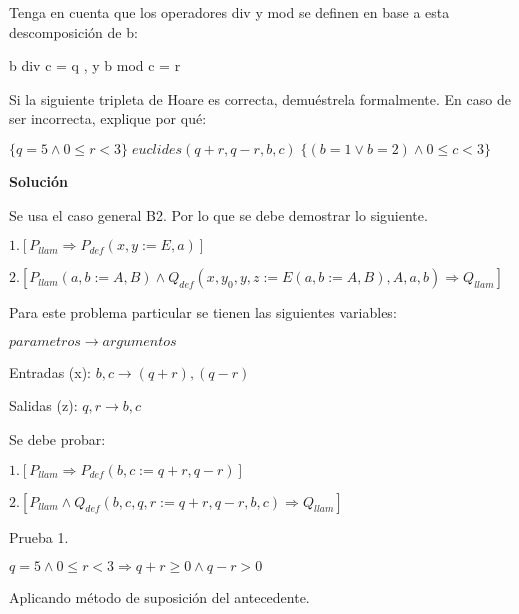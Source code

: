 \documentclass[hidelinks]{article}
\begin{document}
Tenga en cuenta que los operadores div y mod se definen en base a esta
descomposición de b: \par

\begin{center}
	b div c = q , y b mod c = r
\end{center}

Si la siguiente tripleta de Hoare es correcta, demuéstrela formalmente. En caso
de ser incorrecta, explique por qué:\par

$\{ q = 5 \land 0 \leq r < 3 \} \; euclides(q + r, q - r, b, c) \; \{ (b = 1 \lor b = 2) \land 0 \leq c < 3 \}$ \par

\textbf{Solución}

Se usa el caso general B2. Por lo que se debe demostrar lo siguiente. \par

$1. [P_{llam} \Rightarrow P_{def}(x,y := E, a)]$ \par

$2. [P_{llam}(a,b := A, B) \land Q_{def}(x,y_0,y,z := E(a,b := A,B), A, a,b) \Rightarrow Q_{llam}]$ \par

Para este problema particular se tienen las siguientes variables: \par
\hspace{6em} $parametros \rightarrow argumentos$ \par
Entradas (x): $b,c \rightarrow (q+r), (q-r)$ \par
Salidas (z): $q,r \rightarrow b, c$ \par

Se debe probar: \par

$1. [P_{llam} \Rightarrow P_{def}(b,c := q+r, q-r)]$ \par

$2. [P_{llam} \land Q_{def}(b,c,q,r := q+r,q-r, b, c) \Rightarrow Q_{llam}]$ \par

Prueba 1. \par

$q=5 \land 0 \leq r < 3 \Rightarrow q+r \geq 0 \land q-r > 0$ \par

Aplicando método de suposición del antecedente. \par
\end{document}
